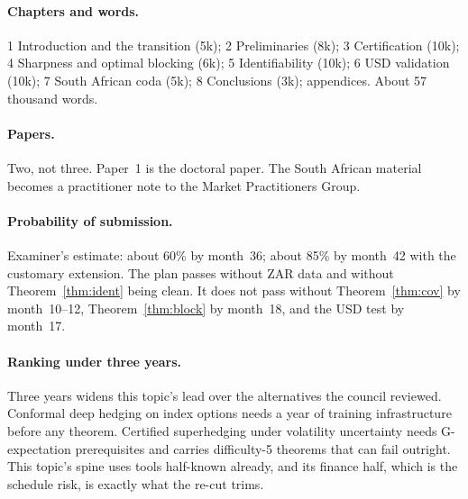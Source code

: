 \documentclass[11pt,a4paper]{article}
\theoremstyle{plain}
\theoremstyle{definition}
\theoremstyle{remark}
\begin{document}
\paragraph{Chapters and words.} 1 Introduction and the transition (5k); 2 Preliminaries (8k); 3 Certification (10k); 4 Sharpness and optimal blocking (6k); 5 Identifiability (10k); 6 USD validation (10k); 7 South African coda (5k); 8 Conclusions (3k); appendices. About 57 thousand words.

\paragraph{Papers.} Two, not three. Paper~1 is the doctoral paper. The South African material becomes a practitioner note to the Market Practitioners Group.

\paragraph{Probability of submission.} Examiner's estimate: about 60\% by month~36; about 85\% by month~42 with the customary extension. The plan passes without ZAR data and without Theorem~\ref{thm:ident} being clean. It does not pass without Theorem~\ref{thm:cov} by month~10--12, Theorem~\ref{thm:block} by month~18, and the USD test by month~17.

\paragraph{Ranking under three years.} Three years widens this topic's lead over the alternatives the council reviewed. Conformal deep hedging on index options needs a year of training infrastructure before any theorem. Certified superhedging under volatility uncertainty needs G-expectation prerequisites and carries difficulty-5 theorems that can fail outright. This topic's spine uses tools half-known already, and its finance half, which is the schedule risk, is exactly what the re-cut trims.
\end{document}
